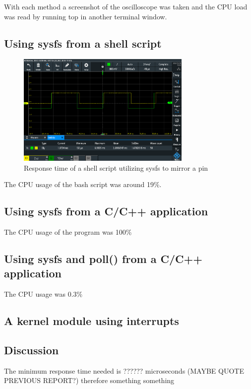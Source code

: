 \documentclass{article}
\begin{document}
With each method a screenshot of the oscilloscope was taken and the CPU load was read by running top in another terminal window.

\subsection{Using sysfs from a shell script}

\begin{figure}[H]
    \centering
    \includegraphics[width=0.75\textwidth]{Project4KernelSpaceEncoderDriver/part2_shell_mirror.PNG}
    \caption{Response time of a shell script utilizing sysfs to mirror a pin}
    \label{fig:shell}
\end{figure}
The CPU usage of the bash script was around 19\%.

\subsection{Using sysfs from a C/C++ application}

The CPU usage of the program was 100\%

\subsection{Using sysfs and poll() from a C/C++ application}

The CPU usage was 0.3\%

\subsection{A kernel module using interrupts}





\subsection{Discussion}
The minimum response time needed is ?????? microseconds (MAYBE QUOTE PREVIOUS REPORT?) therefore something something
\end{document}
